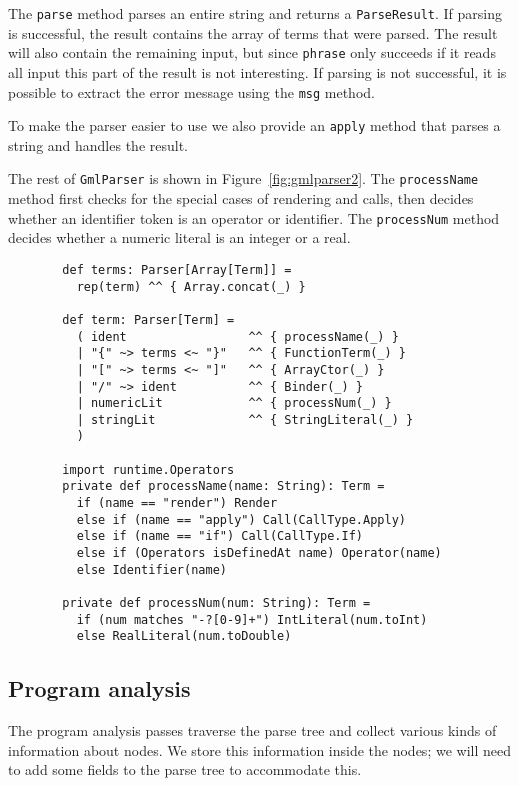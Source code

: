 The \verb!parse! method parses an entire string and
returns a \verb!ParseResult!.
If parsing is successful,
the result contains the array of terms that were parsed.
The result will also contain the remaining input,
but since \verb!phrase! only succeeds if it reads all input
this part of the result is not interesting.
If parsing is not successful, it is possible to extract the error message
using the \verb!msg! method.

To make the parser easier to use
we also provide an \verb!apply! method that parses a string
and handles the result.

The rest of \verb!GmlParser! is shown in Figure~\ref{fig:gmlparser2}.
The \verb!processName! method first checks for the special cases of
rendering and calls,
then decides whether an identifier token is an operator or identifier.
The \verb!processNum! method decides whether a numeric literal is an
integer or a real.

\begin{figure}
\begin{verbatim}
  def terms: Parser[Array[Term]] =
    rep(term) ^^ { Array.concat(_) }

  def term: Parser[Term] =
    ( ident                 ^^ { processName(_) }
    | "{" ~> terms <~ "}"   ^^ { FunctionTerm(_) }
    | "[" ~> terms <~ "]"   ^^ { ArrayCtor(_) }
    | "/" ~> ident          ^^ { Binder(_) }
    | numericLit            ^^ { processNum(_) }
    | stringLit             ^^ { StringLiteral(_) }
    )

  import runtime.Operators
  private def processName(name: String): Term =
    if (name == "render") Render
    else if (name == "apply") Call(CallType.Apply)
    else if (name == "if") Call(CallType.If)
    else if (Operators isDefinedAt name) Operator(name)
    else Identifier(name)

  private def processNum(num: String): Term =
    if (num matches "-?[0-9]+") IntLiteral(num.toInt)
    else RealLiteral(num.toDouble)
\end{verbatim}
\getcaption
\end{figure}


\subsection{Program analysis\label{sec:analysis}}

The program analysis passes traverse the parse tree
and collect various kinds of information about nodes.
We store this information inside the nodes;
we will need to add some fields to the parse tree to accommodate this.

